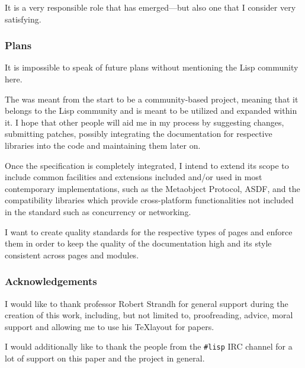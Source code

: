 It is a very responsible role that has emerged---but also one that I consider very satisfying.

\subsubsection{Plans}

It is impossible to speak of future plans without mentioning the Lisp community here.

The \cl{} \us{} was meant from the start to be a community-based project, meaning that it belongs to the Lisp community and is meant to be utilized and expanded within it. I hope that other people will aid me in my process by suggesting changes, submitting patches, possibly integrating the documentation for respective \cl{} libraries into the code and maintaining them later on.

Once the specification is completely integrated, I intend to extend its scope to include common facilities and extensions included and/or used in most contemporary \cl{} implementations, such as the Metaobject Protocol, ASDF, \ql{} and the compatibility libraries which provide cross-platform functionalities not included in the standard such as concurrency or networking.

I want to create quality standards for the respective types of pages and enforce them in order to keep the quality of the documentation high and its style consistent across pages and modules.

\subsubsection{Acknowledgements}

I would like to thank professor Robert Strandh for general support during the creation of this work, including, but not limited to, proofreading, advice, moral support and allowing me to use his \TeX layout for papers.

I would additionally like to thank the people from the \texttt{\#lisp} IRC channel for a lot of support on this paper and the \cl{} \us{} project in general.
